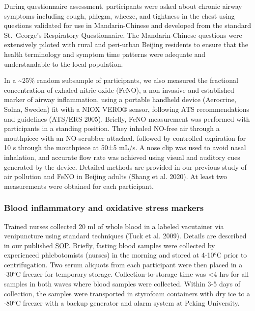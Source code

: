 \documentclass[
  letterpaper,
  DIV=11,
  numbers=noendperiod]{scrartcl}
\begin{document}
During questionnaire assessment, participants were asked about chronic
airway symptoms including cough, phlegm, wheeze, and tightness in the
chest using questions validated for use in Mandarin-Chinese and
developed from the standard St.~George's Respiratory Questionnaire. The
Mandarin-Chinese questions were extensively piloted with rural and
peri-urban Beijing residents to ensure that the health terminology and
symptom time patterns were adequate and understandable to the local
population.

In a \textasciitilde25\% random subsample of participants, we also
measured the fractional concentration of exhaled nitric oxide (FeNO), a
non-invasive and established marker of airway inflammation, using a
portable handheld device (Aerocrine, Solna, Sweden) fit with a NIOX
VERO® sensor, following ATS recommendations and guidelines (ATS/ERS
2005). Briefly, FeNO measurement was performed with participants in a
standing position. They inhaled NO-free air through a mouthpiece with an
NO-scrubber attached, followed by controlled expiration for 10 s through
the mouthpiece at 50±5 mL/s. A nose clip was used to avoid nasal
inhalation, and accurate flow rate was achieved using visual and
auditory cues generated by the device. Detailed methods are provided in
our previous study of air pollution and FeNO in Beijing adults (Shang et
al. 2020). At least two measurements were obtained for each participant.

\hypertarget{blood-inflammatory-and-oxidative-stress-markers}{%
\subsubsection{Blood inflammatory and oxidative stress
markers}\label{blood-inflammatory-and-oxidative-stress-markers}}

Trained nurses collected 20 ml of whole blood in a labeled vacutainer
via venipuncture using standard techniques (Tuck et al. 2009). Details
are described in our published \href{https://osf.io/zwpfg}{SOP}.
Briefly, fasting blood samples were collected by experienced
phlebotomists (nurses) in the morning and stored at 4-10°C prior to
centrifugation. Two serum aliquots from each participant were then
placed in a -30°C freezer for temporary storage. Collection-to-storage
time was \textless4 hrs for all samples in both waves where blood
samples were collected. Within 3-5 days of collection, the samples were
transported in styrofoam containers with dry ice to a -80°C freezer with
a backup generator and alarm system at Peking University.
\end{document}
